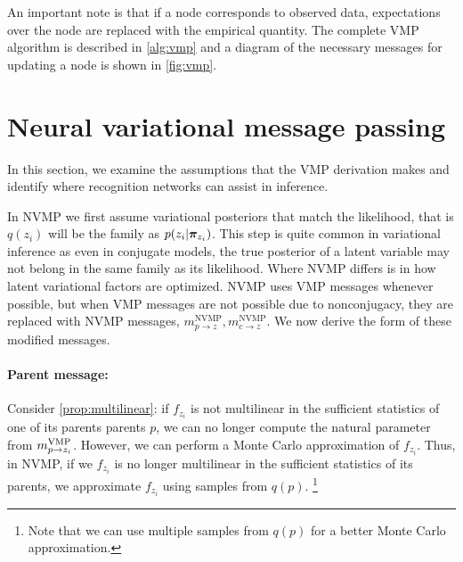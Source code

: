 An important note is that if a node corresponds to observed data,
expectations over the node are replaced with the empirical quantity.
The complete VMP algorithm is described in \autoref{alg:vmp} and
a diagram of the necessary messages for updating a node
is shown in \autoref{fig:vmp}.

\section{Neural variational message passing}
\label{sec:nvmp}

In this section, we examine
the assumptions that the VMP derivation makes
and identify where recognition networks
can assist in inference.

In NVMP we first
assume variational posteriors that match
the likelihood, that is $q(z_i)$ will
be the family as $p(z_i | \bm{\pi}_{z_i})$. 
This step 
is quite common in variational inference
as even in conjugate
models, the true posterior of a latent variable may not belong
in the same family as its likelihood.
Where NVMP differs is in how latent variational factors
are optimized.
NVMP uses VMP messages whenever possible,
but when VMP messages are not possible due to 
nonconjugacy, they are replaced with NVMP messages,
$m^{\text{NVMP}}_{p \rightarrow z},m^{\text{NVMP}}_{c \rightarrow z}$.
We now derive the form of these modified messages.

\paragraph{Parent message:}
Consider \autoref{prop:multilinear}:
if $f_{z_i}$ is not multilinear in the sufficient statistics of one of
its parents
parents $p$,
we can no longer compute the natural parameter
from $m^{\text{VMP}}_{p \rightarrow z_i}$.
However, we can perform a Monte Carlo approximation of $f_{z_i}$.
Thus, in NVMP, if we $f_{z_i}$ is no longer
multilinear in the sufficient statistics of its parents,
we approximate $f_{z_i}$ using samples from $q(p)$.
\footnote{Note that we can use multiple samples from $q(p)$ for a better Monte Carlo
approximation.}


